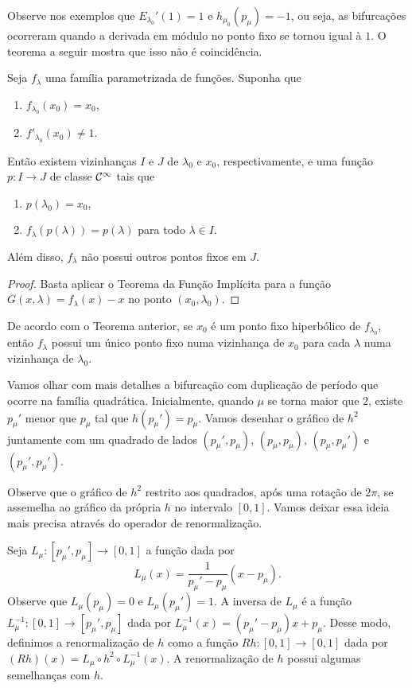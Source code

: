 Observe nos exemplos que $E_{\lambda_0}'(1) = 1$ e $h_{\mu_0}(p_\mu) = -1$, ou seja, as bifurcações ocorreram quando a derivada em módulo no ponto fixo se tornou igual à $1$. O teorema a seguir mostra que isso não é coincidência.

\begin{theorem}
\label{theorem1}
Seja $f_\lambda$ uma família parametrizada de funções.
Suponha que
\begin{enumerate}
\item $f_{\lambda_0}(x_0) = x_0$,
\item $f'_{\lambda_0}(x_0) \neq 1$. 
\end{enumerate}
Então existem vizinhanças $I$ e $J$ de $\lambda_0$ e $x_0$, respectivamente, e uma função $p: I \to J$ de classe $\mathcal{C}^\infty$ tais que
\begin{enumerate}
\item $p(\lambda_0) = x_0$, 
\item $f_\lambda(p(\lambda)) = p(\lambda)$ para todo $\lambda \in I$.
\end{enumerate}
Além disso, $f_\lambda$ não possui outros pontos fixos em $J$.
\end{theorem}

\begin{proof}
Basta aplicar o Teorema da Função Implícita para a função $G(x, \lambda) = f_\lambda(x) - x$ no ponto $(x_0, \lambda_0)$.
\end{proof}

De acordo com o Teorema anterior, se $x_0$ é um ponto fixo hiperbólico de $f_{\lambda_0}$, então $f_\lambda$ possui um único ponto fixo numa vizinhança de $x_0$ para cada $\lambda$ numa vizinhança de $\lambda_0$.

Vamos olhar com mais detalhes a bifurcação com duplicação de período que ocorre na família quadrática.
Inicialmente, quando $\mu$ se torna maior que $2$, existe $p_\mu'$ menor que $p_\mu$ tal que $h(p_\mu') = p_\mu$. Vamos desenhar o gráfico de $h^2$ juntamente com um quadrado de lados $(p_\mu', p_\mu)$, $(p_\mu, p_\mu)$, $(p_\mu, p_\mu')$ e $(p_\mu', p_\mu')$.

Observe que o gráfico de $h^2$ restrito aos quadrados, após uma rotação de $2 \pi$, se assemelha ao gráfico da própria $h$ no intervalo $[0, 1]$. Vamos deixar essa ideia mais precisa através do operador de renormalização.

Seja $L_\mu: [p_\mu', p_\mu] \to [0, 1]$ a função dada por
$$L_\mu(x) = \frac{1}{p_\mu' - p_\mu} (x - p_\mu).$$
Observe que $L_\mu(p_\mu) = 0$ e $L_\mu(p_\mu') = 1$. A inversa de $L_\mu$ é a função $L_\mu^{-1}: [0, 1] \to [p_\mu', p_\mu]$ dada por $L_\mu^{-1}(x) = (p_\mu' - p_\mu)x + p_\mu$. Desse modo, definimos a renormalização de $h$ como a função $Rh: [0, 1] \to [0, 1]$ dada por $(Rh)(x) = L_\mu \circ h^2 \circ L_\mu^{-1}(x)$. A renormalização de $h$ possui algumas semelhanças com $h$.

